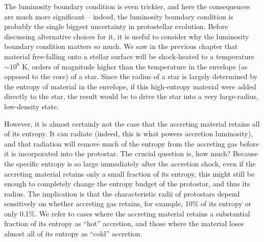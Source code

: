 The luminosity boundary condition is even trickier, and here the consequences are much more significant -- indeed, the luminosity boundary condition is probably the single biggest uncertainty in protostellar evolution. Before discussing alternative choices for it, it is useful to consider why the luminosity boundary condition matters so much. We saw in the previous chapter that material free-falling onto a stellar surface will be shock-heated to a temperature $\sim 10^6$ K, orders of magnitude higher than the temperature in the envelope (as opposed to the core) of a star. Since the radius of a star is largely determined by the entropy of material in the envelope, if this high-entropy material were added directly to the star, the result would be to drive the star into a very large-radius, low-density state.

However, it is almost certainly not the case that the accreting material retains all of its entropy. It can radiate (indeed, this is what powers accretion luminosity), and that radiation will remove much of the entropy from the accreting gas before it is incorporated into the protostar. The crucial question is, how much? Because the specific entropy is so large immediately after the accretion shock, even if the accreting material retains only a small fraction of its entropy, this might still be enough to completely change the entropy budget of the protostar, and thus its radius. The implication is that the characteristic radii of protostars depend sensitively on whether accreting gas retains, for example, 10\% of its entropy or only 0.1\%. We refer to cases where the accreting material retains a substantial fraction of its entropy as ``hot'' accretion, and those where the material loses almost all of its entropy as ``cold'' accretion.

